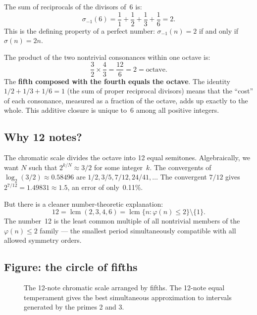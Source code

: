 \documentclass[preprint]{revtex4-2}
\DeclareMathOperator{\lcm}{lcm}
\begin{document}
The sum of reciprocals of the divisors of~6 is:
\begin{equation}
\sigma_{-1}(6) = \frac{1}{1} + \frac{1}{2} + \frac{1}{3} + \frac{1}{6} = 2.
\end{equation}
This is the defining property of a perfect number: $\sigma_{-1}(n) = 2$ if and only if $\sigma(n) = 2n$.

The product of the two nontrivial consonances within one octave is:
\begin{equation}
\frac{3}{2} \times \frac{4}{3} = \frac{12}{6} = 2 = \text{octave}.
\end{equation}
The \textbf{fifth composed with the fourth equals the octave}. The identity $1/2 + 1/3 + 1/6 = 1$ (the sum of proper reciprocal divisors) means that the ``cost'' of each consonance, measured as a fraction of the octave, adds up exactly to the whole. This additive closure is unique to~6 among all positive integers.

\subsection{Why 12 notes?}

The chromatic scale divides the octave into 12 equal semitones. Algebraically, we want $N$ such that $2^{k/N} \approx 3/2$ for some integer~$k$. The convergents of $\log_2(3/2) \approx 0.58496$ are $1/2, 3/5, 7/12, 24/41, \ldots$ The convergent $7/12$ gives $2^{7/12} = 1.49831 \approx 1.5$, an error of only~0.11\%.

But there is a cleaner number-theoretic explanation:
\begin{equation}
12 = \lcm(2, 3, 4, 6) = \lcm\{n : \varphi(n) \leq 2\} \setminus \{1\}.
\end{equation}
The number~12 is the least common multiple of all nontrivial members of the $\varphi(n) \leq 2$ family --- the smallest period simultaneously compatible with all allowed symmetry orders.

\subsection{Figure: the circle of fifths}

\begin{figure}[h]
\centering
\caption{The 12-note chromatic scale arranged by fifths. The 12-note equal temperament gives the best simultaneous approximation to intervals generated by the primes 2 and 3.}
\label{fig:circle}
\end{figure}
\end{document}

